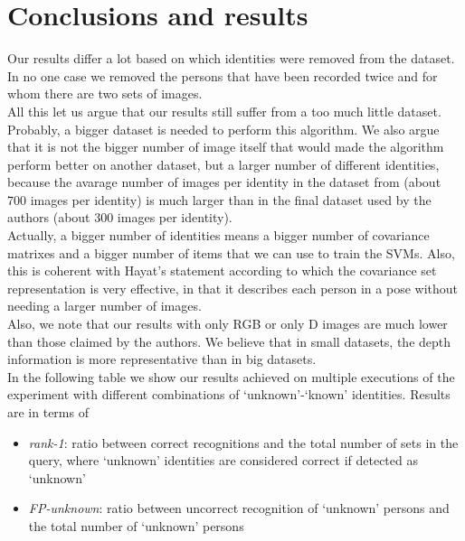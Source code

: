 \documentclass{article}
\begin{document}
\section{Conclusions and results}
Our results differ a lot based on which identities were removed from the dataset.
In no one case we removed the persons that have been recorded twice and for whom
there are two sets of images.
\\
All this let us argue that our results still suffer from a too much little
dataset. Probably, a bigger dataset is needed to perform this algorithm. We
also argue that it is not the bigger number of image itself that would made the
algorithm perform better on another dataset, but a larger number of different
identities, because the avarage number of images per identity in the dataset from
\citep{Fanelli2013} (about 700 images per identity) is much larger than in the
final dataset used by the authors (about 300 images per identity).
\\
Actually, a bigger number of identities means a bigger number of covariance
matrixes and a bigger number of items that we can use to train the SVMs. Also,
this is coherent with Hayat's statement according to which the covariance set
representation is very effective, in that it describes each person in a pose
without needing a larger number of images.
\\
Also, we note that our results with only RGB or only D images are much lower
than those claimed by the authors. We believe that in small datasets, the depth
information is more representative than in big datasets.
\\
In the following table we show our results achieved on multiple executions of
the experiment with different combinations of `unknown'-`known' identities.
Results are in terms of
\begin{itemize}
	\item \textit{rank-1}: ratio between correct recognitions and the
		total number of sets in the query, where `unknown'
		identities are considered correct if detected as `unknown'
	\item \textit{FP-unknown}: ratio between uncorrect recognition of
		`unknown' persons and the total number of `unknown' persons
\end{itemize}
\end{document}
